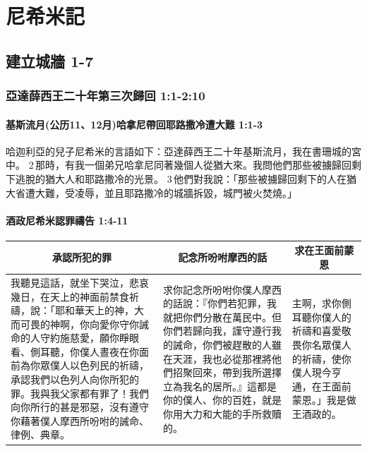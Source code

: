 \chapter{尼希米記}
\section{建立城牆 1-7}
\subsection{亞達薛西王二十年第三次歸回 1:1-2:10}
\subsubsection{基斯流月(公历11、12月)哈拿尼帶回耶路撒冷遭大難 1:1-3}
哈迦利亞的兒子尼希米的言語如下：亞達薛西王二十年基斯流月，我在書珊城的宮中。 2 那時，有我一個弟兄哈拿尼同著幾個人從猶大來。我問他們那些被擄歸回剩下逃脫的猶大人和耶路撒冷的光景。 3 他們對我說：「那些被擄歸回剩下的人在猶大省遭大難，受凌辱，並且耶路撒冷的城牆拆毀，城門被火焚燒。」


\subsubsection{酒政尼希米認罪禱告 1:4-11}
\begin{table}[H]
\centering 
\begin{tabular}{p{7.85cm}|p{}|p{2.75cm}}\hline\hline
\multicolumn{1}{c|}{承認所犯的罪}&\multicolumn{1}{c}{記念所吩咐摩西的話}&\multicolumn{1}{c}{求在王面前蒙恩}\\\hline
我聽見這話，就坐下哭泣，悲哀幾日，在天上的神面前禁食祈禱，說：「耶和華天上的神，大而可畏的神啊，你向愛你守你誡命的人守約施慈愛，願你睜眼看、側耳聽，你僕人晝夜在你面前為你眾僕人以色列民的祈禱，承認我們以色列人向你所犯的罪。我與我父家都有罪了！我們向你所行的甚是邪惡，沒有遵守你藉著僕人摩西所吩咐的誡命、律例、典章。
&求你記念所吩咐你僕人摩西的話說：『你們若犯罪，我就把你們分散在萬民中。但你們若歸向我，謹守遵行我的誡命，你們被趕散的人雖在天涯，我也必從那裡將他們招聚回來，帶到我所選擇立為我名的居所。』這都是你的僕人、你的百姓，就是你用大力和大能的手所救贖的。
&主啊，求你側耳聽你僕人的祈禱和喜愛敬畏你名眾僕人的祈禱，使你僕人現今亨通，在王面前蒙恩。」我是做王酒政的。\\\hline
\end{tabular}
\end{table}


